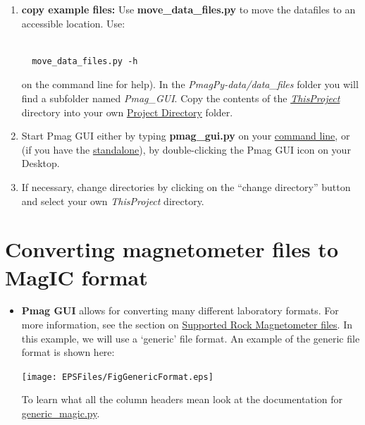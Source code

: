 \documentclass[11pt]{book}
\begin{document}
{{\begin{enumerate}
\item \textbf{copy example files:}  Use \textbf{move\_data\_files.py} to move the  datafiles to an accessible location.  Use: \begin{verbatim}

  move_data_files.py -h\end{verbatim} on the command line for help).  In the {\it PmagPy-data/data\_files } folder you will find a subfolder named {\it Pmag\_GUI}. Copy the contents of the  \href{#Project_Directory}{\it ThisProject} directory  into  your  own \href{#Project_Directory}{Project Directory} folder.
 \item Start Pmag GUI either by typing {\bf pmag\_gui.py} on your \href{#command_line}{command line}, or (if you have the \href{#standalone}{standalone}), by double-clicking the Pmag GUI icon on your Desktop.
 \item If necessary, change directories by clicking  on the ``change directory'' button and select your own {\it ThisProject} directory.
 \end{enumerate}


\section{Converting magnetometer files to MagIC format}
\begin{itemize}
\item {\bf Pmag GUI} allows for converting many different laboratory formats.  For more information, see the section on \href{#magnetometer_files}{Supported Rock Magnetometer files}.   In this example, we will use a `generic' file format.
An example of the generic file format is shown here:

\texttt{[image: EPSFiles/FigGenericFormat.eps]}

To learn what all the column headers mean look at the documentation for \href{#generic_magic.py}{generic\_magic.py}.

%


\end{itemize}}}
\end{document}
